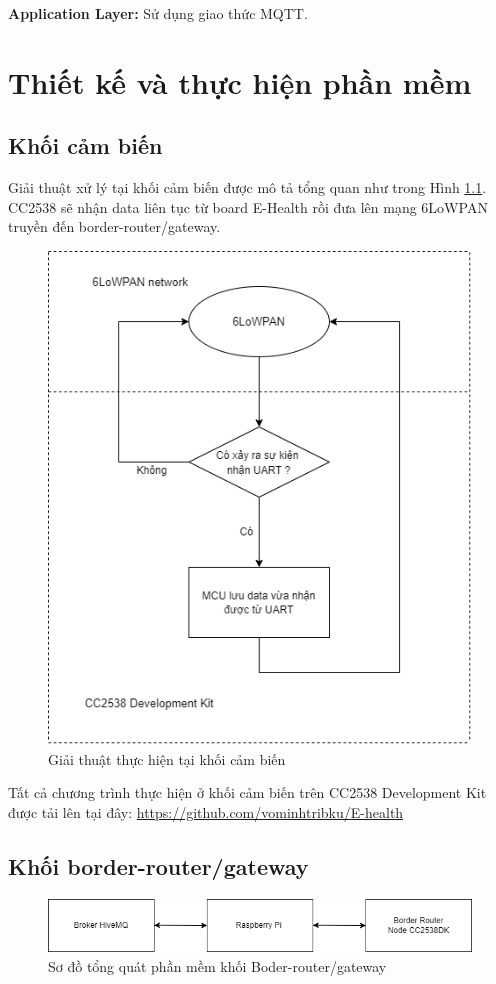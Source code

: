 \documentclass{report}
\begin{document}
\textbf{Application Layer:} Sử dụng giao thức MQTT.
\chapter{Thiết kế và thực hiện phần mềm}
\section{Khối cảm biến}
Giải thuật xử lý tại khối cảm biến được mô tả tổng quan như trong Hình \ref{fig:Graph48}. CC2538 sẽ nhận data liên tục từ board E-Health rồi đưa lên mạng 6LoWPAN truyền đến border-router/gateway.
\begin{figure}[h]
	\centering
	\includegraphics[scale = 0.5]{fig48.png}
	\caption{Giải thuật thực hiện tại khối cảm biến}
	\label{fig:Graph48}
\end{figure}

Tất cả chương trình thực hiện ở khối cảm biến trên CC2538 Development Kit được tải lên tại đây: \url{https://github.com/vominhtribku/E-health}
\newpage
\section{Khối border-router/gateway}
\begin{figure}[h]
	\centering
	\includegraphics[scale = 0.5]{fig49.png}
	\caption{Sơ đồ tổng quát phần mềm khối Boder-router/gateway}
	\label{fig:Graph49}
\end{figure}
\end{document}
